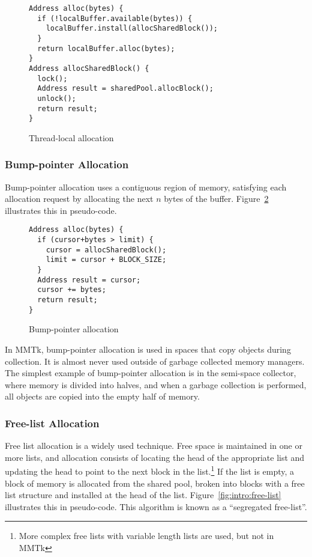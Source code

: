 \begin{figure}
\begin{centering}
\begin{lstlisting}
Address alloc(bytes) {
  if (!localBuffer.available(bytes)) {
    localBuffer.install(allocSharedBlock());
  }
  return localBuffer.alloc(bytes);
}
Address allocSharedBlock() {
  lock();
  Address result = sharedPool.allocBlock();
  unlock();
  return result;
}
\end{lstlisting}
\end{centering}
\caption{Thread-local allocation}
\label{fig:intro:thread-local-alloc}
\end{figure}


\subsubsection{Bump-pointer Allocation}

Bump-pointer allocation uses a contiguous region of memory, satisfying each allocation
request by allocating the next $n$ bytes of the buffer.  Figure~\ref{fig:intro:bump-pointer}
illustrates this in pseudo-code.  

\begin{figure}[h!]
\begin{centering}
\begin{lstlisting}
Address alloc(bytes) {
  if (cursor+bytes > limit) {
    cursor = allocSharedBlock();
    limit = cursor + BLOCK_SIZE;
  }
  Address result = cursor;
  cursor += bytes;
  return result;
}
\end{lstlisting}
\end{centering}
\caption{Bump-pointer allocation}
\label{fig:intro:bump-pointer}
\end{figure}

In MMTk, bump-pointer allocation is used in spaces that copy objects during collection.  
It is almost never used outside of garbage collected memory managers.  The simplest example
of bump-pointer allocation is in the semi-space collector, where memory is divided into halves,
and when a garbage collection is performed, all objects are copied into the empty half of memory.

\subsubsection{Free-list Allocation}

Free list allocation is a widely used technique.  Free space is maintained in one or more lists,
and allocation consists of locating the head of the appropriate list and updating the head to point
to the next block in the list.\footnote{More complex free lists with variable length lists are used, but not in MMTk}
If the list is empty, a block of memory is allocated from the shared pool, broken into blocks
with a free list structure and installed at the head of the list.  Figure~\ref{fig:intro:free-list}
illustrates this in pseudo-code.  This algorithm is known as a ``segregated free-list''.

